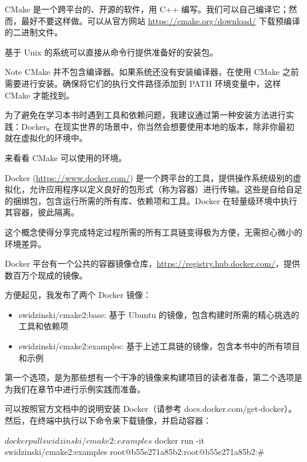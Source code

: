 
CMake 是一个跨平台的、开源的软件，用 C++ 编写。我们可以自己编译它；然而，最好不要这样做。可以从官方网站 \url{https://cmake.org/download/} 下载预编译的二进制文件。

基于 Unix 的系统可以直接从命令行提供准备好的安装包。

\begin{myNotic}{Note}
CMake 并不包含编译器。如果系统还没有安装编译器，在使用 CMake 之前需要进行安装。确保将它们的执行文件路径添加到 PATH 环境变量中，这样 CMake 才能找到。

为了避免在学习本书时遇到工具和依赖问题，我建议通过第一种安装方法进行实践：Docker。在现实世界的场景中，你当然会想要使用本地的版本，除非你最初就在虚拟化的环境中。
\end{myNotic}

来看看 CMake 可以使用的环境。


Docker (\url{https://www.docker.com/}) 是一个跨平台的工具，提供操作系统级别的虚拟化，允许应用程序以定义良好的包形式（称为容器）进行传输。这些是自给自足的捆绑包，包含运行所需的所有库、依赖项和工具。Docker 在轻量级环境中执行其容器，彼此隔离。

这个概念使得分享完成特定过程所需的所有工具链变得极为方便，无需担心微小的环境差异。

Docker 平台有一个公共的容器镜像仓库，\url{https://registry.hub.docker.com/}，提供数百万个现成的镜像。

方便起见，我发布了两个 Docker 镜像：

\begin{itemize}
\item
swidzinski/cmake2:base: 基于 Ubuntu 的镜像，包含构建时所需的精心挑选的工具和依赖项

\item
swidzinski/cmake2:examples: 基于上述工具链的镜像，包含本书中的所有项目和示例
\end{itemize}

第一个选项，是为那些想有一个干净的镜像来构建项目的读者准备，第二个选项是为我们在章节中进行示例实践而准备。

可以按照官方文档中的说明安装 Docker（请参考 docs.docker.com/get-docker）。然后，在终端中执行以下命令来下载镜像，并启动容器：

\begin{shell}
$ docker pull swidzinski/cmake2:examples
$ docker run -it swidzinski/cmake2:examples
root@b55e271a85b2:root@b55e271a85b2:#
\end{shell}

